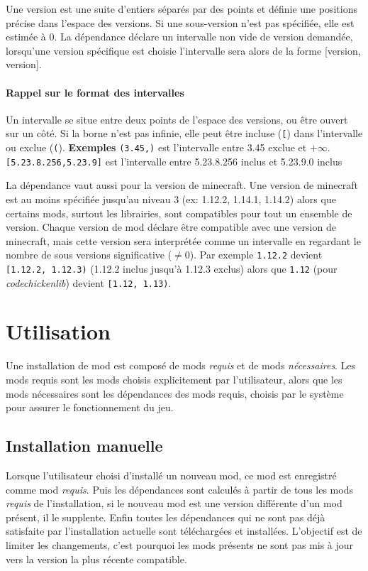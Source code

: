 \documentclass{article}
\begin{document}
Une version est une suite d'entiers séparés par des points et définie une positions précise dans l'espace des versions.
Si une sous-version n'est pas spécifiée, elle est estimée à 0.
La dépendance déclare un intervalle non vide de version demandée, lorsqu'une version spécifique est choisie l'intervalle sera alors de la forme [version, version].

\paragraph{Rappel sur le format des intervalles}
Un intervalle se situe entre deux points de l'espace des versions, ou être ouvert sur un côté.
Si la borne n'est pas infinie, elle peut être incluse (\verb|[|) dans l'intervalle ou exclue (\verb|(|).
\newline\textbf{Exemples}
\verb|(3.45,)| est l'intervalle entre 3.45 exclue et $+\infty$.
\verb|[5.23.8.256,5.23.9]| est l'intervalle entre 5.23.8.256 inclus et 5.23.9.0 inclus

La dépendance vaut aussi pour la version de minecraft.
Une version de minecraft est au moins spécifiée jusqu'au niveau 3 (ex: 1.12.2, 1.14.1, 1.14.2) alors que certains mods, surtout les librairies, sont compatibles pour tout un ensemble de version.
Chaque version de mod déclare être compatible avec une version de minecraft, mais cette version sera interprétée comme un intervalle en regardant le nombre de sous versions significative ($\neq 0$).
Par exemple \verb|1.12.2| devient \verb|[1.12.2, 1.12.3)| (1.12.2 inclus jusqu'à 1.12.3 exclus) alors que \verb|1.12| (pour \textit{codechickenlib}) devient \verb|[1.12, 1.13)|.

%
%
\section{Utilisation}
\label{section:utilisation}
Une installation de mod est composé de mods \textit{requis} et de mods \textit{nécessaires}.
Les mods requis sont les mods choisis explicitement par l'utilisateur, alors que les mods nécessaires sont les dépendances des mods requis, choisis par le système pour assurer le fonctionnement du jeu.

\subsection{Installation manuelle}
\label{section:utilisation.manuelle}
Lorsque l'utilisateur choisi d'installé un nouveau mod, ce mod est enregistré comme mod \textit{requis}.
Puis les dépendances sont calculés à partir de tous les mods \textit{requis} de l'installation, si le nouveau mod est une version différente d'un mod présent, il le supplente.
Enfin toutes les dépendances qui ne sont pas déjà satisfaite par l'installation actuelle sont téléchargées et installées.
L'objectif est de limiter les changements, c'est pourquoi les mods présents ne sont pas mis à jour vers la version la plus récente compatible.
\end{document}
